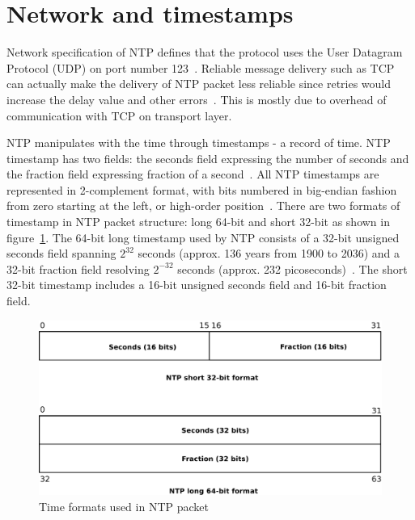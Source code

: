 
\section{Network and timestamps}\label{sec:ntp-network}
Network specification of NTP defines that
the protocol uses the User Datagram Protocol (UDP) on port number 123~\cite{ianna-ports,rfc5905}.
Reliable message delivery such as TCP can actually make the delivery of
NTP packet less reliable since retries
would increase the delay value and other errors~\cite{rfc5905}.
This is mostly due to overhead of communication with TCP on transport layer.

NTP manipulates with the time through timestamps - a record of time.
NTP timestamp has two fields: the seconds field expressing the number of seconds
and the fraction field expressing fraction of a second~\cite{rfc5905}.
All NTP timestamps are represented in 2-complement format, with
bits numbered in big-endian fashion from zero starting at the left, or high-order position~\cite{rfc5905}.
There are two formats of timestamp in NTP packet structure:
long 64-bit and short 32-bit as shown in figure~\ref{fig:ntp-timestamps}.
The 64-bit long timestamp used by NTP consists of a 32-bit unsigned seconds
field spanning $2^{32}$ seconds (approx. 136 years from 1900 to 2036) and a 32-bit fraction field resolving
$2^{-32}$ seconds (approx. 232 picoseconds)~\cite{rfc5905}.
The short 32-bit timestamp includes a 16-bit unsigned seconds field
and 16-bit fraction field.

\begin{figure}
	\centering
	\includegraphics[width=13cm,keepaspectratio]{fig/ntp-timestamps.pdf}
	\caption{Time formats used in NTP packet}
	\label{fig:ntp-timestamps}
	\bigskip
\end{figure}

